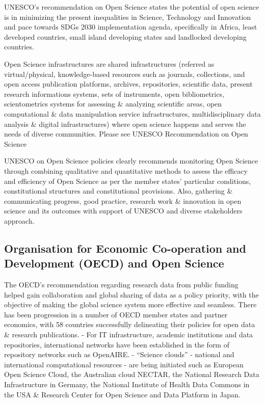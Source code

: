 \documentclass[
  letterpaper,
  DIV=11,
  numbers=noendperiod]{scrreport}
\begin{document}
UNESCO's recommendation on Open Science states the potential of open
science is in minimizing the present inequalities in Science, Technology
and Innovation and pace towards SDGs 2030 implementation agenda,
specifically in Africa, least developed countries, small island
developing states and landlocked developing countries.

Open Science infrastructures are shared infrastructures (referred as
virtual/physical, knowledge-based resources such as journals,
collections, and open access publication platforms, archives,
repositories, scientific data, present research informations systems,
sets of instruments, open bibliometrics, scientometrics systems for
assessing \& analyzing scientific areas, open computational \& data
manipulation service infrastructures, multidisciplinary data analysis \&
digital infrastructures) where open science happens and serves the needs
of diverse communities. Please see UNESCO Recommendation on Open Science

UNESCO on Open Science policies clearly recommends monitoring Open
Science through combining qualitative and quantitative methods to assess
the efficacy and efficiency of Open Science as per the member states'
particular conditions, constitutional structures and constitutional
provisions. Also, gathering \& communicating progress, good practice,
research work \& innovation in open science and its outcomes with
support of UNESCO and diverse stakeholders approach.

\hypertarget{organisation-for-economic-co-operation-and-development-oecd-and-open-science}{%
\subsection{Organisation for Economic Co-operation and Development
(OECD) and Open
Science}\label{organisation-for-economic-co-operation-and-development-oecd-and-open-science}}

The OECD's recommendation regarding research data from public funding
helped gain collaboration and global sharing of data as a policy
priority, with the objective of making the global science system more
effective and seamless. There has been progression in a number of OECD
member states and partner economics, with 58 countries successfully
delineating their policies for open data \& research publications. - For
IT infrastructure, academic institutions and data repositories,
international networks have been established in the form of repository
networks such as OpenAIRE. - ``Science clouds'' - national and
international computational resources - are being initiated such as
European Open Science Cloud, the Australian cloud NECTAR, the National
Research Data Infrastructure in Germany, the National Institute of
Health Data Commons in the USA \& Research Center for Open Science and
Data Platform in Japan.
\end{document}
